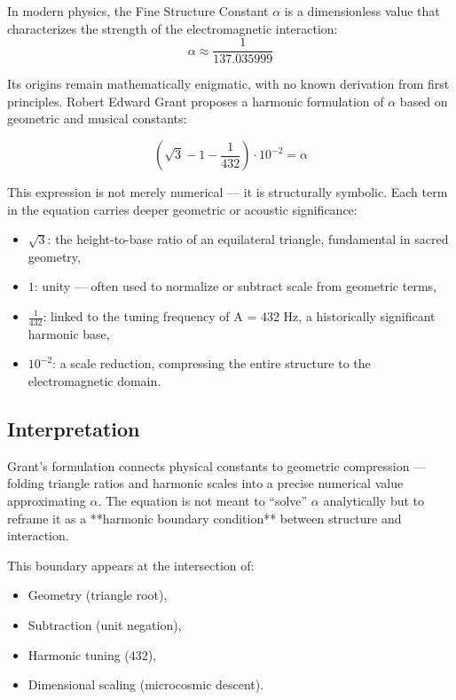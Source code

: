 \documentclass[12pt]{article}
\begin{document}
In modern physics, the Fine Structure Constant \(\alpha\) is a dimensionless value that characterizes the strength of the electromagnetic interaction:
\[
\alpha \approx \frac{1}{137.035999}
\]

Its origins remain mathematically enigmatic, with no known derivation from first principles. Robert Edward Grant proposes a harmonic formulation of \(\alpha\) based on geometric and musical constants:

\begin{equation}
\left( \sqrt{3} - 1 - \frac{1}{432} \right) \cdot 10^{-2} = \alpha
\end{equation}

This expression is not merely numerical — it is structurally symbolic. Each term in the equation carries deeper geometric or acoustic significance:

\begin{itemize}[leftmargin=1.5em]
    \item \( \sqrt{3} \): the height-to-base ratio of an equilateral triangle, fundamental in sacred geometry,
    \item \( 1 \): unity — often used to normalize or subtract scale from geometric terms,
    \item \( \frac{1}{432} \): linked to the tuning frequency of A = 432 Hz, a historically significant harmonic base,
    \item \( 10^{-2} \): a scale reduction, compressing the entire structure to the electromagnetic domain.
\end{itemize}

\subsection*{Interpretation}

Grant’s formulation connects physical constants to geometric compression — folding triangle ratios and harmonic scales into a precise numerical value approximating \(\alpha\). The equation is not meant to “solve” \(\alpha\) analytically but to reframe it as a **harmonic boundary condition** between structure and interaction.

This boundary appears at the intersection of:
\begin{itemize}[leftmargin=1.5em]
    \item Geometry (triangle root),
    \item Subtraction (unit negation),
    \item Harmonic tuning (432),
    \item Dimensional scaling (microcosmic descent).
\end{itemize}
\end{document}
